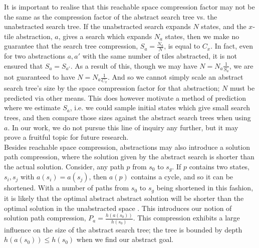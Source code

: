\documentclass{article}
\begin{document}
   It is important to realise that this reachable space compression factor
   may not be the same as the compression factor of the abstract search tree vs.
   the unabstracted search tree.
   If the unabstracted search expands \(N\) states,
   and the \(x\)-tile abstraction, \(a\), gives a search which expands \(N_a\) states,
   then we make no guarantee that the search tree compression, \(S_a = \frac{N_a}{N}\),
   is equal to \(C_x\).
   In fact, even for two abstractions \(a, a'\) with the same number of tiles abstracted,
   it is not ensured that \(S_a = S_{a'}\).
   As a result of this, though we may have \(N = N_a \frac{1}{S_a}\),
   we are not guaranteed to have \(N = N_a \frac{1}{C_x}\).
   And so we cannot simply scale an abstract search tree's size
   by the space compression factor for that abstraction;
   \(N\) must be predicted via other means. This does however motivate
   a method of prediction where we estimate \(S_a\),
   i.e. we could sample initial states which give small search trees,
   and then compare those sizes against the abstract search trees when using \(a\).
   In our work, we do not pursue this line of inquiry any further,
   but it may prove a fruitful topic for future research. \\

   Besides reachable space compression, abstractions may also introduce a solution path
   compression, where the solution given by the abstract search is shorter than
   the actual solution. Consider, any path \(p\) from \(s_0\) to \(s_g\).
   If \(p\) contains two states, \(s_i, s_j\) with \(a(s_i) = a(s_j)\),
   then \(a(p)\) contains a cycle, and so it can be shortened.
   With a number of paths from \(s_0\) to \(s_g\) being shortened in this fashion,
   it is likely that the optimal abstract abstract solution will be shorter than the optimal solution in
   the unabstracted space \cite{helmert2007flexible}. This introduces
   our notion of solution path compression, \(P_a = \frac{h(a(s_0))}{h(s_0)}\).
   This compression exhibits a large influence on the size of the abstract search tree;
   the tree is bounded by depth \(h(a(s_0)) \leq h(s_0)\) when we find our abstract goal. \\
\end{document}
